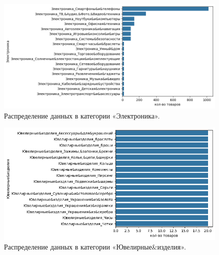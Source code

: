 \documentclass[a4paper,12pt]{extarticle}
\begin{document}
\begin{figure}[hbtp]
	\centering
	\includegraphics[scale=0.8]{приложения/amount_of_category_Электроника.png}
	\caption{Распределение данных в категории «Электроника».}
	\label{fig:amount_of_category_Электроника}
\end{figure}

\begin{figure}[hbtp]
	\centering
	\includegraphics[scale=0.8]{приложения/amount_of_category_Ювелирные&изделия.png}
	\caption{Распределение данных в категории «Ювелирные\&изделия».}
	\label{fig:amount_of_category_Ювелирные&изделия}
\end{figure}
\end{document}
